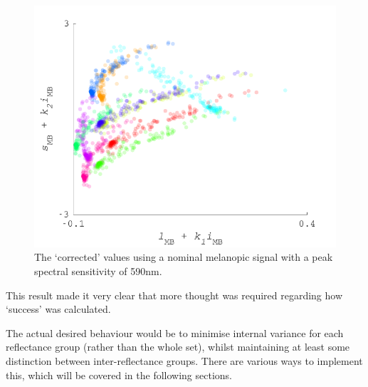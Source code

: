 \begin{figure}[htbp]
    \includegraphics[max width=\textwidth]{figs/comp/transformToIllIndSpace/correctedChromaticities_range590.pdf}
    \caption{The `corrected' values using a nominal melanopic signal with a peak spectral sensitivity of 590nm.}
    \label{fig:590}
\end{figure} 

This result made it very clear that more thought was required regarding how `success' was calculated.

The actual desired behaviour would be to minimise internal variance for each reflectance group (rather than the whole set), whilst maintaining at least some distinction between inter-reflectance groups. There are various ways to implement this, which will be covered in the following sections. %

